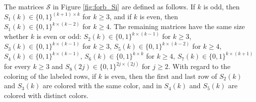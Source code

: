 \documentclass[12pt]{book}
\theoremstyle{plain}
\theoremstyle{remark}
\begin{document}
The matrices $\mathcal{S}$ in Figure \ref{fig:forb_Si} are defined as follows. 
If $k$ is odd, then $S_1(k) \in \{0,1\}^{(k+1) \times k}$ for $k \geq 3$, and if $k$ is even, then $S_1(k) \in \{0,1\}^{k \times (k-2)}$ for $k\geq 4$.
The remaining matrices have the same size whether $k$ is even or odd: $S_2(k) \in \{0,1\}^{k \times (k-1)}$ for $k \geq 3$, 
$S_3(k) \in \{0,1\}^{k \times (k-1)}$ for $k \geq 3$, 
$S_5(k) \in \{0,1\}^{k \times (k-2)}$ for $k \geq 4$, 
$S_4(k) \in \{0,1\}^{k \times (k-1)}$, $S_6(k) \in \{0,1\}^{k \times k}$ for $k\geq 4$,
$S_7(k) \in \{0,1\}^{k \times (k+1)}$ for every $k \geq 3$
and $S_8(2j) \in \{0,1\}^{2j \times (2j)}$ for $j \geq 2$. 
With regard to the coloring of the labeled rows, if $k$ is even, then the first and last row of $S_2(k)$ and $S_3(k)$ are colored with the same color, and in $S_4(k)$ and $S_5(k)$ are colored with distinct colors. 	
\end{document}

